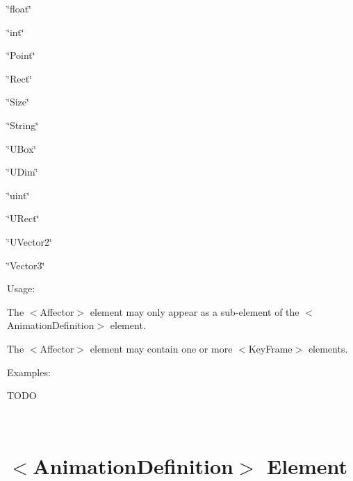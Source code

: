 \begin{DoxyItemize}
\begin{DoxyItemize}
\begin{DoxyItemize}
\item {\ttfamily \char`\"{}float\char`\"{}} 
\item {\ttfamily \char`\"{}int\char`\"{}} 
\item {\ttfamily \char`\"{}\+Point\char`\"{}} 
\item {\ttfamily \char`\"{}\+Rect\char`\"{}} 
\item {\ttfamily \char`\"{}\+Size\char`\"{}} 
\item {\ttfamily \char`\"{}\+String\char`\"{}} 
\item {\ttfamily \char`\"{}\+U\+Box\char`\"{}} 
\item {\ttfamily \char`\"{}\+U\+Dim\char`\"{}} 
\item {\ttfamily \char`\"{}uint\char`\"{}} 
\item {\ttfamily \char`\"{}\+U\+Rect\char`\"{}} 
\item {\ttfamily \char`\"{}\+U\+Vector2\char`\"{}} 
\item {\ttfamily \char`\"{}\+Vector3\char`\"{}} 
\end{DoxyItemize}
\end{DoxyItemize}
\item Usage\+:
\begin{DoxyItemize}
\item The $<$Affector$>$ element may only appear as a sub-\/element of the $<$Animation\+Definition$>$ element.
\item The $<$Affector$>$ element may contain one or more $<$Key\+Frame$>$ elements.
\end{DoxyItemize}
\item Examples\+:
\begin{DoxyItemize}
\item T\+O\+DO
\end{DoxyItemize}
\end{DoxyItemize}

~\newline
 \hypertarget{xml_animation_xml_animation_animationdefinition}{}\section{$<$\+Animation\+Definition$>$ Element}\label{xml_animation_xml_animation_animationdefinition}

